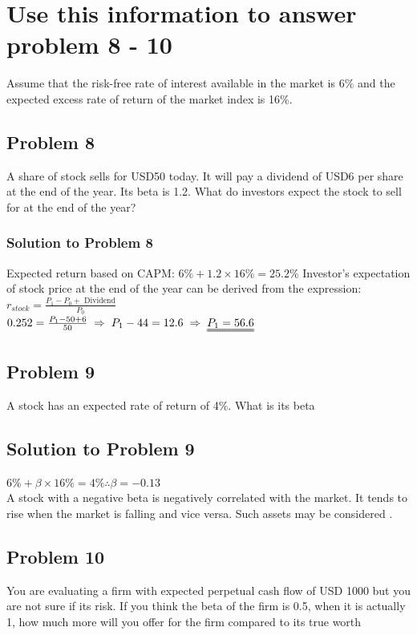 \documentclass[12]{article}
\begin{document}
\color{black}
\section*{Use this information to answer problem 8 - 10}
{\large Assume that the risk-free rate of interest available in the market is 6\% and the expected excess rate of return of the market index is 16\%.}
\color{black}
\subsection*{Problem 8}
A share of stock sells for USD50 today. It will pay a dividend of USD6 per share at the end of the year. Its beta is 1.2. What do investors expect the stock to sell for at the end of the year? 


\color{blue}
\subsubsection*{Solution to Problem 8}
Expected return based on CAPM: $6\% + 1.2\times 16\% = 25.2\%$
Investor's expectation of stock price at the end of the year can be derived from the expression:\\
{\Large $r_{stock} = \frac{P_1 - P_0 + \text{ Dividend}}{P_0}$}\\
{\large $0.252 = \frac{P_1 - 50 + 6}{50} \;\Rightarrow\; P_1 - 44 = 12.6 \;\Rightarrow\; \uuline{P_1 = 56.6}$}


\color{black}
\subsection*{Problem 9}
A stock has an expected rate of return of 4\%. What is its beta

\color{blue}
\subsection*{Solution to Problem 9}
$6\% + \beta \times 16\% = 4\% \therefore \beta = -0.13$\\
A stock with a negative beta is negatively correlated with the market. It tends to rise when the market is falling and vice versa. Such assets may be considered .


\color{black}
\subsection*{Problem 10}
You are  evaluating a firm with expected perpetual cash flow of USD 1000 but you are not sure if its risk. If you think the beta of the firm is 0.5, when it is actually 1, how much more will you offer for the firm compared to its true worth
\end{document}
